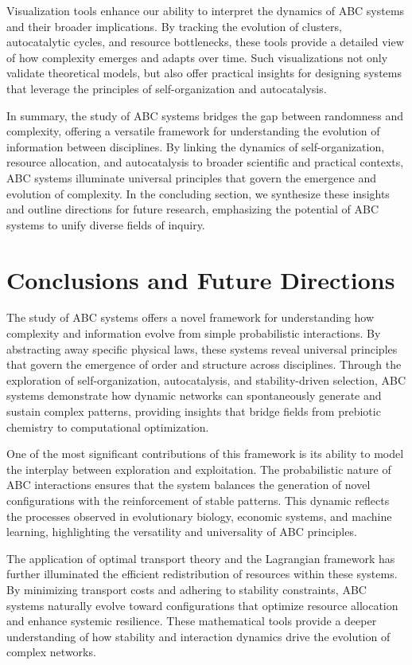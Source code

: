 \documentclass[%
 preprint, linenumbers,
 amsmath,amssymb,
 aps, physrev,
]{revtex4-2}
\begin{document}
Visualization tools enhance our ability to interpret the dynamics of ABC systems and their broader implications. By tracking the evolution of clusters, autocatalytic cycles, and resource bottlenecks, these tools provide a detailed view of how complexity emerges and adapts over time. Such visualizations not only validate theoretical models, but also offer practical insights for designing systems that leverage the principles of self-organization and autocatalysis.

In summary, the study of ABC systems bridges the gap between randomness and complexity, offering a versatile framework for understanding the evolution of information between disciplines. By linking the dynamics of self-organization, resource allocation, and autocatalysis to broader scientific and practical contexts, ABC systems illuminate universal principles that govern the emergence and evolution of complexity. In the concluding section, we synthesize these insights and outline directions for future research, emphasizing the potential of ABC systems to unify diverse fields of inquiry.

\section{Conclusions and Future Directions}

The study of ABC systems offers a novel framework for understanding how complexity and information evolve from simple probabilistic interactions. By abstracting away specific physical laws, these systems reveal universal principles that govern the emergence of order and structure across disciplines. Through the exploration of self-organization, autocatalysis, and stability-driven selection, ABC systems demonstrate how dynamic networks can spontaneously generate and sustain complex patterns, providing insights that bridge fields from prebiotic chemistry to computational optimization.

One of the most significant contributions of this framework is its ability to model the interplay between exploration and exploitation. The probabilistic nature of ABC interactions ensures that the system balances the generation of novel configurations with the reinforcement of stable patterns. This dynamic reflects the processes observed in evolutionary biology, economic systems, and machine learning, highlighting the versatility and universality of ABC principles.

The application of optimal transport theory and the Lagrangian framework has further illuminated the efficient redistribution of resources within these systems. By minimizing transport costs and adhering to stability constraints, ABC systems naturally evolve toward configurations that optimize resource allocation and enhance systemic resilience. These mathematical tools provide a deeper understanding of how stability and interaction dynamics drive the evolution of complex networks.
\end{document}
